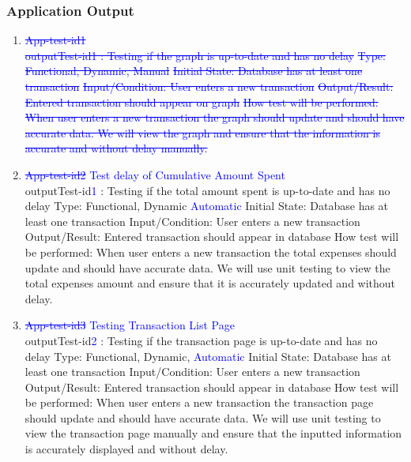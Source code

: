 \documentclass[12pt, titlepage]{article}
\begin{document}
\subsubsection{Application Output}
\begin{enumerate}
\item{\textcolor{blue}{\st{App-test-id1\\}}}
\textcolor{blue}{\st{outputTest-id1 : Testing if the graph is up-to-date and has no delay}}
\newline
\textcolor{blue}{\st{Type: Functional, Dynamic, Manual}}
\newline
\textcolor{blue}{\st{Initial State: Database has at least one transaction}}
\newline
\textcolor{blue}{\st{Input/Condition: User enters a new transaction}}
\newline
\textcolor{blue}{\st{Output/Result: Entered transaction should appear on graph}}
\newline
\textcolor{blue}{\st{How test will be performed: When user enters a new transaction the graph should update and should have accurate data. We will view the graph and ensure that the information is accurate and without delay manually.}}

\item{\textcolor{blue}{\st{App-test-id2} Test delay of Cumulative Amount Spent }\\}
outputTest-id\textcolor{blue}{1} : Testing if the total amount spent is up-to-date and has no delay
\newline
Type: Functional, Dynamic \textcolor{blue}{Automatic}
\newline
Initial State: Database has at least one transaction
\newline
Input/Condition: User enters a new transaction
\newline
Output/Result: Entered transaction should appear in database
\newline
How test will be performed: When user enters a new transaction the total expenses should update and should have accurate data. We will use unit testing to view the total expenses amount and ensure that it is accurately updated and without delay.

\item{\textcolor{blue}{\st{App-test-id3} Testing Transaction List Page}\\}
outputTest-id\textcolor{blue}{2} : Testing if the transaction page is up-to-date and has no delay
\newline
Type: Functional, Dynamic, \textcolor{blue}{Automatic}
\newline
Initial State: Database has at least one transaction
\newline
Input/Condition: User enters a new transaction
\newline
Output/Result: Entered transaction should appear in database
\newline
How test will be performed: When user enters a new transaction the transaction page should update and should have accurate data.  We will use unit testing to view the transaction page manually and ensure that the inputted information is accurately displayed and without delay.


\end{enumerate}
\end{document}

